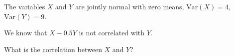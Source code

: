 
\begin{question}
The variables \(X\) and \(Y\) are jointly normal with zero means, \(\mathrm{Var}(X) = 4\),
\(\mathrm{Var}(Y) = 9\).

We know that \(X -0.5 Y\) is not correlated with \(Y\).

What is the correlation between \(X\) and \(Y\)?
\end{question}


